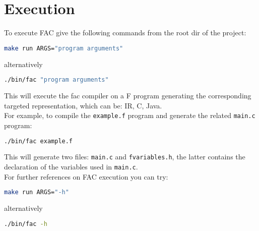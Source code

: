 \section{Execution}

To execute FAC give the following commands from the root dir of the project:
\begin{lstlisting}[language=bash,
caption={FAC - execution},captionpos=b,frame=single]
make run ARGS="program arguments"
\end{lstlisting}
alternatively
\begin{lstlisting}[language=bash,
caption={FAC - execution (explicit)},captionpos=b,frame=single]
./bin/fac "program arguments"
\end{lstlisting}
This will execute the fac compiler on a F program generating the corresponding
targeted representation, which can be: IR, C, Java.
\\
For example, to compile the \verb|example.f| program and generate the related 
\verb|main.c| program:
\begin{lstlisting}[language=bash,
caption={FAC - execution: example},captionpos=b,frame=single]
./bin/fac example.f
\end{lstlisting}
This will generate two files: \verb|main.c| and \verb|fvariables.h|, 
the latter contains the declaration of the variables used in \verb|main.c|.
\\
For further references on FAC execution you can try:
\begin{lstlisting}[language=bash,
caption={FAC execution - help mode},captionpos=b,frame=single]
make run ARGS="-h"
\end{lstlisting}
alternatively
\begin{lstlisting}[language=bash,
caption={FAC - execution: help mode (explicit)},captionpos=b,frame=single]
./bin/fac -h
\end{lstlisting}